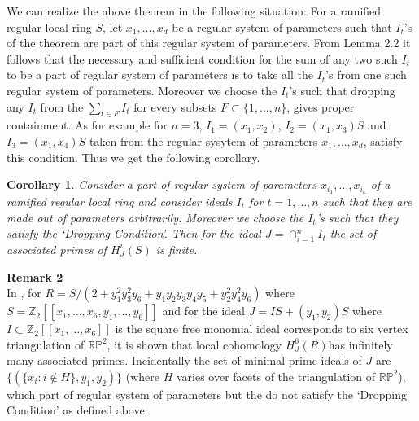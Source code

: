 \documentclass[10pt]{amsart}
\theoremstyle{plain}
\newtheorem{cor}{Corollary}
\theoremstyle{definition}
\begin{document}
We can realize the above theorem in the following situation: For a ramified regular local ring $S$, let $x_1,\dots,x_d$ be a regular system of parameters such that $I_t$'s of the theorem are part of this regular system of parameters. From Lemma 2.2 it follows that the necessary and sufficient condition for the sum of any two such $I_t$ to be a part of regular system of parameters is to take all the $I_t$'s from one such regular system of parameters. Moreover we choose the $I_t$'s such that dropping any $I_t$ from the $\sum_{t\in F}I_t$ for every subsets $F\subset\{1,\dots,n\}$, gives proper containment. As for example for $n=3$, $I_1=(x_1,x_2)$, $I_2=(x_1,x_3)S$ and $I_3=(x_1,x_4)S$ taken from the regular sysytem of parameters $x_1,\ldots, x_d$, satisfy this condition. Thus we get the following corollary.

\begin{cor}
Consider a part of regular system of parameters $x_{i_1},\dots,x_{i_k}$ of a ramified regular local ring and consider ideals $I_t$ for $t=1,\ldots, n$ such that they are made out of parameters arbitrarily. Moreover we choose the $I_t$'s such that they satisfy the `Dropping Condition'. Then for the ideal $J=\cap^n_{i=1}I_t$ the set of associated primes of $H^i_{J}(S)$ is finite.
\end{cor}

{\bf Remark 2}\\

In \cite{Ma}, for $R = S/(2 + y^2_1 y^2_3 y_6 + y_1y_2y_3y_4y_5 + y^2_2 y^2_4 y_6)$ where $S = \mathbb{Z}_2[[x_1,\ldots, x_6, y_1,\ldots, y_6]] $ and for the ideal $J=IS +(y_1, y_2)S$ where $I\subset \mathbb{Z}_2[[x_1,\ldots, x_6]]$ is the square free monomial ideal corresponds to six vertex triangulation of $\mathbb{R}\mathbb{P}^2$, it is shown that local cohomology $H^6_J (R)$has infinitely many associated primes. Incidentally the set of minimal prime ideals of $J$ are $\{(\{x_i: i\notin H\}, y_1, y_2)\}$ (where $H$ varies over facets of the triangulation of $\mathbb{R}\mathbb{P}^2$), which part of regular system of parameters but the do not satisfy the `Dropping Condition' as defined above. 


\end{document}
